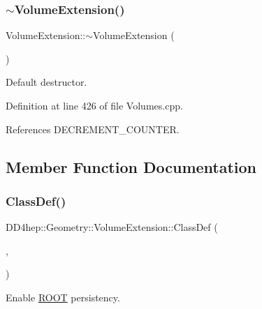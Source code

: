 \subsubsection{\texorpdfstring{$\sim$\+Volume\+Extension()}{~VolumeExtension()}}
{\footnotesize\ttfamily Volume\+Extension\+::$\sim$\+Volume\+Extension (\begin{DoxyParamCaption}{ }\end{DoxyParamCaption})\hspace{0.3cm}{\ttfamily [virtual]}}



Default destructor. 



Definition at line 426 of file Volumes.\+cpp.



References D\+E\+C\+R\+E\+M\+E\+N\+T\+\_\+\+C\+O\+U\+N\+T\+ER.



\subsection{Member Function Documentation}
\hypertarget{class_d_d4hep_1_1_geometry_1_1_volume_extension_abdf0afaa48f61a81e56d99f4a7f2ae6b}{}\label{class_d_d4hep_1_1_geometry_1_1_volume_extension_abdf0afaa48f61a81e56d99f4a7f2ae6b} 
\subsubsection{\texorpdfstring{Class\+Def()}{ClassDef()}}
{\footnotesize\ttfamily D\+D4hep\+::\+Geometry\+::\+Volume\+Extension\+::\+Class\+Def (\begin{DoxyParamCaption}\item[{\hyperlink{class_d_d4hep_1_1_geometry_1_1_volume_extension}{Volume\+Extension}}]{,  }\item[{1}]{ }\end{DoxyParamCaption})}



Enable \hyperlink{namespace_r_o_o_t}{R\+O\+OT} persistency. 

\hypertarget{class_d_d4hep_1_1_geometry_1_1_volume_extension_a9384fd683e751216c07236b8f1e400c2}{}\label{class_d_d4hep_1_1_geometry_1_1_volume_extension_a9384fd683e751216c07236b8f1e400c2} 

